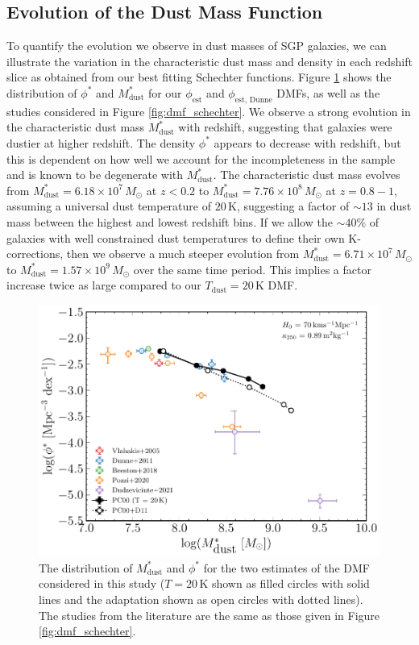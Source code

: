 \subsection{Evolution of the Dust Mass Function}

To quantify the evolution we observe in dust masses of SGP galaxies, we can illustrate the variation in the characteristic dust mass and density in each redshift slice as obtained from our best fitting Schechter functions. Figure \ref{fig:dmf_schechter_parameters} shows the distribution of $\phi^*$ and $M_{\textrm{dust}}^*$ for our $\phi_{\textrm{est}}$ and $\phi_{\textrm{est, Dunne}}$ DMFs, as well as the studies considered in Figure \ref{fig:dmf_schechter}. We observe a strong evolution in the characteristic dust mass $M_{\textrm{dust}}^*$ with redshift, suggesting that galaxies were dustier at higher redshift. The density $\phi^*$ appears to decrease with redshift, but this is dependent on how well we account for the incompleteness in the sample and is known to be degenerate with $M_{\textrm{dust}}^*$. The characteristic dust mass evolves from $M_{\textrm{dust}}^* = 6.18\times10^7\,M_{\odot}$ at $z < 0.2$ to $M_{\textrm{dust}}^* = 7.76\times10^8\,M_{\odot}$ at $z = 0.8 - 1$, assuming a universal dust temperature of $20\,$K, suggesting a factor of $\sim 13$ in dust mass between the highest and lowest redshift bins. If we allow the $\sim 40\%$ of galaxies with well constrained dust temperatures to define their own K-corrections, then we observe a much steeper evolution from $M_{\textrm{dust}}^* = 6.71\times10^7\,M_{\odot}$ to $M_{\textrm{dust}}^* = 1.57\times10^9\,M_{\odot}$ over the same time period. This implies a factor increase twice as large compared to our $T_{\textrm{dust}} = 20\,$K DMF.

\begin{figure}
	\centering
	\includegraphics[width=0.8\columnwidth]{Figures/dmf_schechter_parameters.pdf}
	\caption[Distribution of $M_{\textrm{dust}}^*$ and $\phi^*$ from best fitting Schechter functions]{The distribution of $M_{\textrm{dust}}^*$ and $\phi^*$ for the two estimates of the DMF considered in this study ($T = 20\,$K shown as filled circles with solid lines and the \citealt{Dunne_2011} adaptation shown as open circles with dotted lines). The studies from the literature are the same as those given in Figure \ref{fig:dmf_schechter}.}
	\label{fig:dmf_schechter_parameters}
\end{figure}

